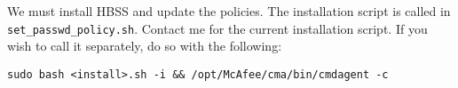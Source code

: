 We must install HBSS and update the policies. The installation script is called in \texttt{set\_passwd\_policy.sh}. Contact me for the current installation script. If you wish to call it separately, do so with the following:

\begin{verbatim}
sudo bash <install>.sh -i && /opt/McAfee/cma/bin/cmdagent -c
\end{verbatim}
